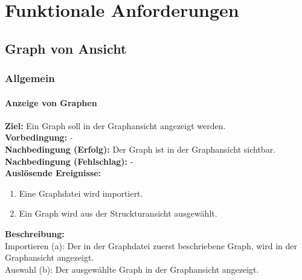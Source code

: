 \chapter{Funktionale Anforderungen}
\label{ch:funktionen}


\setcounter{fanr}{10}
\newcommand{\fano}[1]{\subsubsection{#1}\addtocounter{fanr}{10}}
\newcommand{\subfano}[1]{\subsubsection{#1}\addtocounter{fanr}{1}}
\renewcommand\thesubsubsection{/FA\ifnum\value{fanr}<10 00\else\ifnum\value{fanr}<100 0\fi\fi\arabic{fanr}/}

\section{Graph von Ansicht}

\subsection{Allgemein}

\fano{Anzeige von Graphen}\label{fa:graphen}
\textbf{Ziel:} Ein Graph soll in der Graphansicht angezeigt werden.\\
\textbf{Vorbedingung:} -\\
\textbf{Nachbedingung (Erfolg):} Der Graph ist in der Graphansicht sichtbar.\\
\textbf{Nachbedingung (Fehlschlag):} -\\
\textbf{Auslösende Ereignisse:}
\begin{enumerate}[nolistsep, label=(\alph*)]
  \item Eine Graphdatei wird importiert.
  \item Ein Graph wird aus der Struckturansicht ausgewählt.
\end{enumerate}
\textbf{Beschreibung:}\\
Importieren (a): Der in der Graphdatei zuerst beschriebene Graph, wird in der Graphansicht angezeigt.\\
Auswahl (b): Der ausgewählte Graph in der Graphansicht angezeigt.


